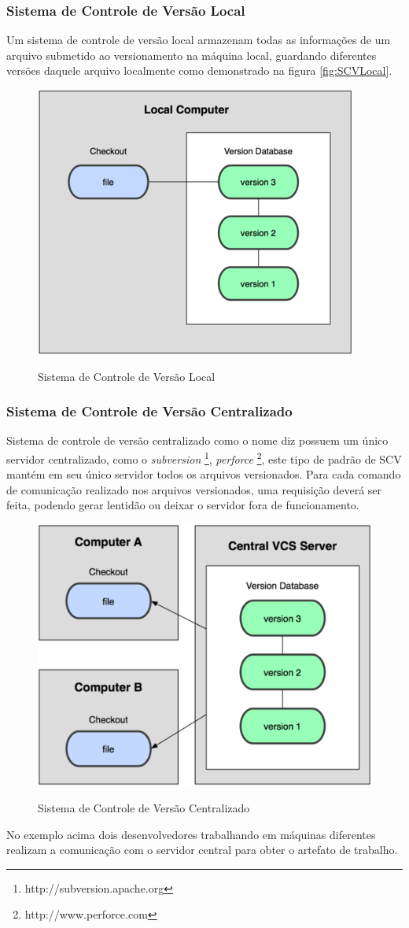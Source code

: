 \subsubsection{Sistema de Controle de Versão Local}
Um sistema de controle de versão local	armazenam todas as informações de um arquivo submetido ao versionamento na máquina local, guardando diferentes versões daquele arquivo localmente como demonstrado na figura \autoref{fig:SCVLocal}.
\begin{figure}[tbh]
\centering
\caption[Sistema de Controle de Versão Local]{Sistema de Controle de Versão Local}
\includegraphics[width=0.6\linewidth]{./images/scvlocal}
\label{fig:SCVLocal}
\end{figure}
\subsubsection{Sistema de Controle de Versão Centralizado} Sistema de controle de versão centralizado como o nome diz possuem um único servidor centralizado, como o \textit{subversion} \footnote{http://subversion.apache.org}, \textit{perforce} \footnote{http://www.perforce.com}, este tipo de padrão de SCV mantém em seu único servidor todos os arquivos versionados. Para cada comando de comunicação realizado nos arquivos versionados, uma requisição deverá ser feita, podendo gerar lentidão ou deixar o servidor fora de funcionamento.
\begin{figure}[tbh]
\centering
\caption[Sistema de Controle de Versão Centralizado]{Sistema de Controle de Versão Centralizado}
\includegraphics[width=0.7\linewidth]{./images/scvcentral}
\label{fig:SCVCentral}
\end{figure}
No exemplo acima dois desenvolvedores trabalhando em máquinas diferentes realizam a comunicação com o servidor central para obter o artefato de trabalho.	
